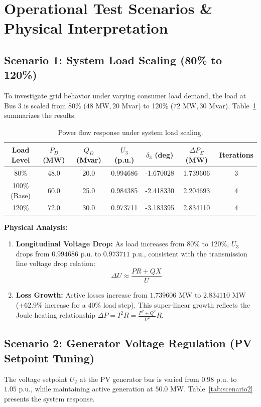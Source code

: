 \documentclass[12pt,a4paper,oneside]{report}
\begin{document}
\section{Operational Test Scenarios \& Physical Interpretation}

\subsection{Scenario 1: System Load Scaling (80\% to 120\%)}
To investigate grid behavior under varying consumer load demand, the load at Bus 3 is scaled from 80\% ($48\text{ MW}, 20\text{ Mvar}$) to 120\% ($72\text{ MW}, 30\text{ Mvar}$). Table~\ref{tab:scenario1} summarizes the results.

\begin{table}[H]
\centering
\caption{Power flow response under system load scaling.}
\label{tab:scenario1}
\begin{tabular}{ccccccc}
\toprule
\textbf{Load Level} & \textbf{$P_D$ (MW)} & \textbf{$Q_D$ (Mvar)} & \textbf{$U_3$ (p.u.)} & \textbf{$\delta_3$ (deg)} & \textbf{$\Delta P_{\Sigma}$ (MW)} & \textbf{Iterations} \\
\midrule
80\% & 48.0 & 20.0 & 0.994686 & -1.670028 & 1.739606 & 3 \\
100\% (Base) & 60.0 & 25.0 & 0.984385 & -2.418330 & 2.204693 & 4 \\
120\% & 72.0 & 30.0 & 0.973711 & -3.183395 & 2.834110 & 4 \\
\bottomrule
\end{tabular}
\end{table}

\textbf{Physical Analysis:}
\begin{enumerate}
    \item \textbf{Longitudinal Voltage Drop:} As load increases from 80\% to 120\%, $U_3$ drops from $0.994686\text{ p.u.}$ to $0.973711\text{ p.u.}$, consistent with the transmission line voltage drop relation:
    \begin{equation}
    \Delta U \approx \frac{P R + Q X}{U}
    \end{equation}
    \item \textbf{Loss Growth:} Active losses increase from $1.739606\text{ MW}$ to $2.834110\text{ MW}$ (+62.9\% increase for a 40\% load step). This super-linear growth reflects the Joule heating relationship $\Delta P = I^2 R = \frac{P^2 + Q^2}{U^2} R$.
\end{enumerate}

\subsection{Scenario 2: Generator Voltage Regulation (PV Setpoint Tuning)}
The voltage setpoint $U_2$ at the PV generator bus is varied from $0.98\text{ p.u.}$ to $1.05\text{ p.u.}$, while maintaining active generation at $50.0\text{ MW}$. Table~\ref{tab:scenario2} presents the system response.
\end{document}
